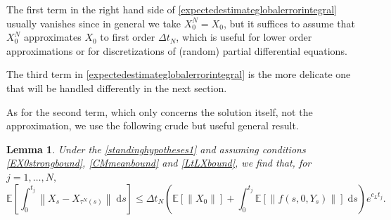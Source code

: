 \documentclass[reqno,12pt]{amsart}
\theoremstyle{plain} %
\newtheorem{lemma}{Lemma}[section]
\theoremstyle{definition} %
\begin{document}
The first term in the right hand side of \cref{expectedestimateglobalerrorintegral} usually vanishes since in general we take $X_0^N = X_0$, but it suffices to assume that $X_0^N$ approximates $X_0$ to first order $\Delta t_N$, which is useful for lower order approximations or for discretizations of (random) partial differential equations.

The third term in \cref{expectedestimateglobalerrorintegral} is the more delicate one that will be handled differently in the next section.

As for the second term, which only concerns the solution itself, not the approximation, we use the following crude but useful general result.

\begin{lemma}
    Under the \cref{standinghypotheses1} and assuming conditions \cref{EX0strongbound}, \cref{CMmeanbound} and \cref{LtLXbound}, we find that, for $j=1, \ldots, N,$
    \begin{equation}
        \label{estimatesecondterminglobalstrongerrorintegral}
        \mathbb{E}\left[\int_0^{t_j}\left\|X_s - X_{\tau^N(s)}\right\| \;\mathrm{d}s\right] \leq \Delta t_N \left(\mathbb{E}[\|X_0\|] + \int_0^{t_j} \mathbb{E}[\|f(s, 0, Y_s)\|]\;\mathrm{d}s\right) e^{c_L t_j}.
    \end{equation}
\end{lemma}
\end{document}
